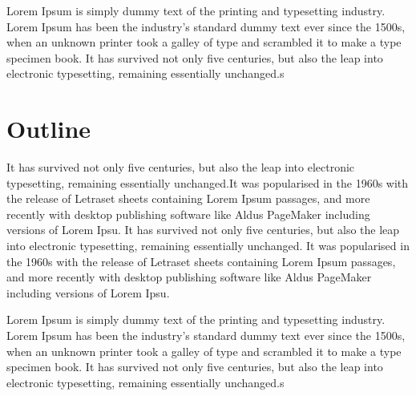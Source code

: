 Lorem Ipsum is simply dummy text of the printing and typesetting industry. Lorem Ipsum has been the industry's standard dummy text ever since the 1500s, when an unknown printer took a galley of type and scrambled it to make a type specimen book. It has survived not only five centuries, but also the leap into electronic typesetting, remaining essentially unchanged.s

\section{Outline}

It has survived not only five centuries, but also the leap into electronic typesetting, remaining essentially unchanged.It was popularised in the 1960s with the release of Letraset sheets containing Lorem Ipsum passages, and more recently with desktop publishing software like Aldus PageMaker including versions of Lorem Ipsu. It has survived not only five centuries, but also the leap into electronic typesetting, remaining essentially unchanged. It was popularised in the 1960s with the release of Letraset sheets containing Lorem Ipsum passages, and more recently with desktop publishing software like Aldus PageMaker including versions of Lorem Ipsu.

Lorem Ipsum is simply dummy text of the printing and typesetting industry. Lorem Ipsum has been the industry's standard dummy text ever since the 1500s, when an unknown printer took a galley of type and scrambled it to make a type specimen book. It has survived not only five centuries, but also the leap into electronic typesetting, remaining essentially unchanged.s